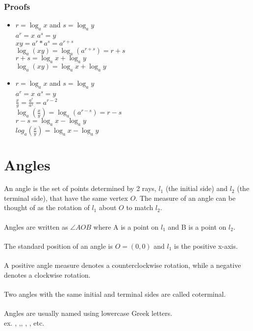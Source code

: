 \documentclass[fleqn]{article}
\newcommand\tab[1][1cm]{\hspace*{#1}}
\begin{document}
\subsubsection{Proofs}
\begin{itemize}
    \item \(r = \log_a x\) and \(s = \log_a y\)\\
    \tab \(a^r = x\) \tab \(a^s = y\)\\
    \tab \(xy = a^r * a^s = a^{r+s}\)\\
    \tab \(\log_a (xy) = \log_a (a^{r+s}) = r+s\)\\
    \tab \(r+s = \log_a x + \log_a y\)\\
    \tab \(\log_a (xy) = \log_a x + \log_a y\)
    \item \(r = \log_a x\) and \(s = \log_a y\)\\
    \tab \(a^r = x\) \tab \(a^s = y\)\\
    \tab \(\frac{x}{y} = \frac{a^r}{a^s} = a^{r-2}\)\\
    \tab \(\log_a (\frac{x}{y}) = \log_a (a^{r-s}) = r-s\)\\
    \tab \(r-s = \log_a x - \log_a y\)\\
    \tab \(log_a (\frac{x}{y}) = \log_a x - \log_a y\)\\
\end{itemize}

\clearpage

\section{Angles}

An angle is the set of points determined by 2 rays, \(l_1\) (the initial side) and \(l_2\) (the terminal side), that have the same vertex \(O\). The measure of an angle can be thought of as the rotation of \(l_1\) about \(O\) to match \(l_2\).\\\\
Angles are written as \(\angle{AOB}\) where A is a point on \(l_1\) and B is a point on \(l_2\).\\\\
The standard position of an angle is \(O = (0,0)\) and \(l_1\) is the positive x-axis.\\\\
A positive angle measure denotes a counterclockwise rotation, while a negative denotes a clockwise rotation.\\\\
Two angles with the same initial and terminal sides are called coterminal.\\\\
Angles are usually named using lowercase Greek letters.\\
ex. \alpha, \beta,, \gamma, \theta, etc.
\end{document}
